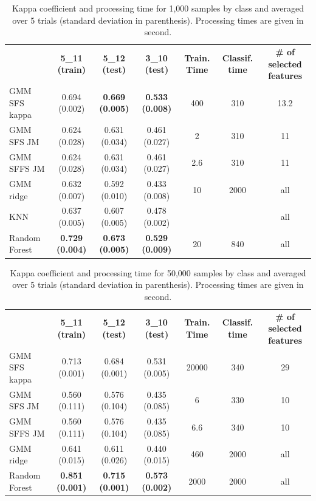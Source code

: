 \documentclass[journal,peerreview,onecolumn]{IEEEtran}
\begin{document}
    \begin{table}[!t]
        \centering
        \caption{Kappa coefficient and processing time for 1,000 samples by class and averaged over 5 trials (standard deviation in parenthesis). Processing times are given in second.\label{tab:potsdam-otbsimu}}
        \begin{tabular}{lcccccc}\toprule
            & {\bfseries 5\_11 (train)} & {\bfseries 5\_12 (test)} & {\bfseries 3\_10 (test)} & {\bfseries Train. Time} & {\bfseries Classif. time} & {\bfseries \# of selected features} \\ \cline{2-7}
            GMM SFS kappa & 0.694 (0.002)             & {\bfseries 0.669 (0.005)} & {\bfseries 0.533 (0.008)} & 400 & 310  & 13.2 \\
            GMM SFS JM &    0.624 (0.028)             & 0.631 (0.034)             & 0.461 (0.027)             & 2   & 310  & 11 \\
            GMM SFFS JM &   0.624 (0.028)             & 0.631 (0.034)             & 0.461 (0.027)             & 2.6 & 310  & 11 \\
            GMM ridge &     0.632 (0.007)             & 0.592 (0.010)             & 0.433 (0.008)             & 10  & 2000 & all \\
            KNN &           0.637 (0.005)             & 0.607 (0.005)             & 0.478 (0.002)             &     &      & all \\
            Random Forest & {\bfseries 0.729 (0.004)} & {\bfseries 0.673 (0.005)} & {\bfseries 0.529 (0.009)} & 20  & 840  & all \\
            \bottomrule
        \end{tabular}
    \end{table}

    \begin{table}[!t]
        \centering
        \caption{Kappa coefficient and processing time for 50,000 samples by class and averaged over 5 trials (standard deviation in parenthesis). Processing times are given in second.\label{tab:potsdam-otbsimu-big}}
        \begin{tabular}{|lcccccc}\toprule
            & {\bfseries 5\_11 (train)} & {\bfseries 5\_12 (test)} & {\bfseries 3\_10 (test)} & {\bfseries Train. Time} & {\bfseries Classif. time} & {\bfseries \# of selected features} \\ \cline{2-7}
            GMM SFS kappa & 0.713 (0.001) & 0.684 (0.001) & 0.531 (0.005) & 20000 & 340 & 29 \\
            GMM SFS JM &    0.560 (0.111) & 0.576 (0.104) & 0.435 (0.085) & 6 & 330 & 10 \\
            GMM SFFS JM &   0.560 (0.111) & 0.576 (0.104) & 0.435 (0.085) & 6.6 & 340 & 10 \\
            GMM ridge &     0.641 (0.015) & 0.611 (0.026) & 0.440 (0.015) & 460 & 2000 & all \\
            Random Forest & {\bfseries 0.851 (0.001)} & {\bfseries 0.715 (0.001)} & {\bfseries 0.573 (0.002)} & 2000 & 2000 & all \\
            \bottomrule
        \end{tabular}
    \end{table}
\end{document}
